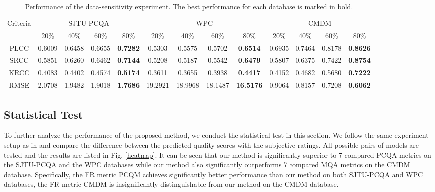 \documentclass[lettersize,journal]{IEEEtran}
\begin{document}
\begin{table*}[t]
\renewcommand\arraystretch{1.5}
\setlength{\abovecaptionskip}{-5pt}
  \caption{ Performance of the data-sensitivity experiment. The best performance for each database is marked in bold.}
  
  \label{tab:param}
  \begin{center}
  \begin{tabular}{c|cccc|cccc|cccc}
    \toprule
    \multirow{2}{*}{Criteria}  & \multicolumn{4}{c|}{SJTU-PCQA}  & \multicolumn{4}{c|}{WPC}  &\multicolumn{4}{c}{CMDM} \\
    \cline{2-13}
    & 20\% & 40\% & 60\% & 80\% & 20\% & 40\% & 60\% & 80\% & 20\% & 40\% & 60\% & 80\% \\
    \hline
    PLCC & 0.6009 & 0.6458 & 0.6655 & \textbf{0.7282} & 0.5303 & 0.5575 & 0.5702 & \textbf{0.6514} & 0.6935 & 0.7464 & 0.8178   & \textbf{0.8626} \\
    SRCC & 0.5851 & 0.6260 & 0.6462 & \textbf{0.7144} & 0.5208 & 0.5187 & 0.5542 & \textbf{0.6479} & 0.5807 & 0.6375 & 0.7422   & \textbf{0.8754} \\
    KRCC & 0.4083 & 0.4402 & 0.4574 & \textbf{0.5174} & 0.3611 & 0.3655 & 0.3938 & \textbf{0.4417} & 0.4152 & 0.4682 & 0.5680   & \textbf{0.7222} \\
    RMSE & 2.0708 & 1.9482 & 1.9018 & \textbf{1.7686} & 19.2921 & 18.9968 & 18.1487 & \textbf{16.5176} & 0.9064 & 0.8157 & 0.7208   & \textbf{0.6062} \\
    \bottomrule
  \end{tabular}
  \end{center}
  \vspace{-0.4cm}
\end{table*}











\subsection{Statistical Test}
To further analyze the performance of the proposed method, we conduct the statistical test in this section. We follow the same experiment setup as in \cite{statistic-test} and compare the difference between the predicted quality scores with the subjective ratings. All possible pairs of models are tested and the results are listed in Fig. \ref{heatmap}. 
It can be seen that our method is significantly superior to 7 compared PCQA metrics on the SJTU-PCQA and the WPC databases while our method also significantly outperforms 7 compared MQA metrics on the CMDM database. Specifically, the FR metric PCQM achieves significantly better performance than our method on both SJTU-PCQA and WPC databases, the FR metric CMDM is insignificantly distinguishable from our method on the CMDM database.
\end{document}
